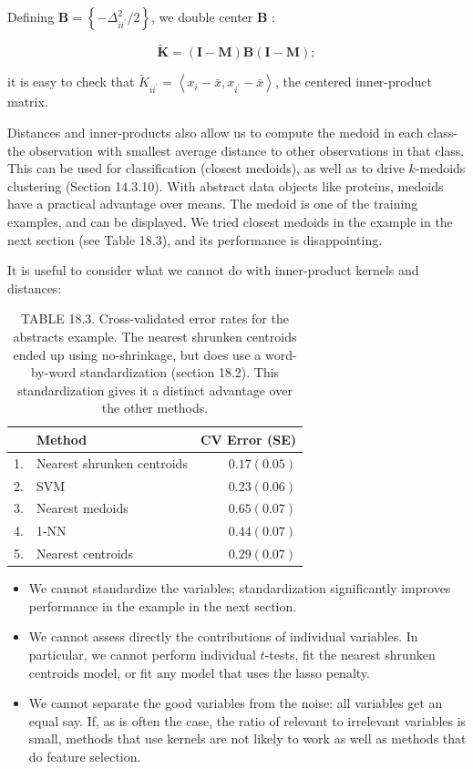 \documentclass[10pt]{article}
\begin{document}
Defining $\mathbf{B}=\left\{-\Delta_{i i^{\prime}}^{2} / 2\right\}$, we double center $\mathbf{B}$ :


\begin{equation*}
\tilde{\mathbf{K}}=(\mathbf{I}-\mathbf{M}) \mathbf{B}(\mathbf{I}-\mathbf{M}) ; \tag{18.31}
\end{equation*}


it is easy to check that $\tilde{K}_{i i^{\prime}}=\left\langle x_{i}-\bar{x}, x_{i^{\prime}}-\bar{x}\right\rangle$, the centered inner-product matrix.

Distances and inner-products also allow us to compute the medoid in each class-the observation with smallest average distance to other observations in that class. This can be used for classification (closest medoids), as well as to drive $k$-medoids clustering (Section 14.3.10). With abstract data objects like proteins, medoids have a practical advantage over means. The medoid is one of the training examples, and can be displayed. We tried closest medoids in the example in the next section (see Table 18.3), and its performance is disappointing.

It is useful to consider what we cannot do with inner-product kernels and distances:

\begin{table}[h]
\begin{center}
\captionsetup{labelformat=empty}
\caption{TABLE 18.3. Cross-validated error rates for the abstracts example. The nearest shrunken centroids ended up using no-shrinkage, but does use a word-by-word standardization (section 18.2). This standardization gives it a distinct advantage over the other methods.}
\begin{tabular}{llr}
\hline
 & Method & CV Error (SE) \\
\hline
1. & Nearest shrunken centroids & $0.17(0.05)$ \\
2. & SVM & $0.23(0.06)$ \\
3. & Nearest medoids & $0.65(0.07)$ \\
4. & 1-NN & $0.44(0.07)$ \\
5. & Nearest centroids & $0.29(0.07)$ \\
\hline
\end{tabular}
\end{center}
\end{table}

\begin{itemize}
  \item We cannot standardize the variables; standardization significantly improves performance in the example in the next section.
  \item We cannot assess directly the contributions of individual variables. In particular, we cannot perform individual $t$-tests, fit the nearest shrunken centroids model, or fit any model that uses the lasso penalty.
  \item We cannot separate the good variables from the noise: all variables get an equal say. If, as is often the case, the ratio of relevant to irrelevant variables is small, methods that use kernels are not likely to work as well as methods that do feature selection.
\end{itemize}
\end{document}
